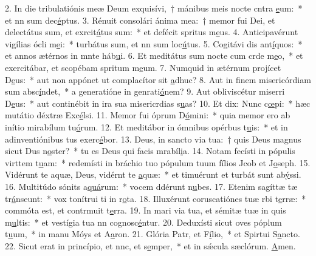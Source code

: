 2. In die tribulatiónis meæ Deum exquisívi,~† mánibus meis nocte cntra \uline{e}um:~* et nn sum dec\uline{é}ptus.
3. Rénuit consolári ánima mea:~† memor fui Dei, et delectátus sum, et exrcit\uline{á}tus sum:~* et defécit spritus m\uline{e}us.
4. Anticipavérunt vigílias ócli m\uline{e}i:~* turbátus sum, et nn sum loc\uline{ú}tus.
5. Cogitávi dis ant\uline{í}quos:~* et annos ætérnos in mnte háb\uline{u}i.
6. Et meditátus sum nocte cum crde m\uline{e}o,~* et exercitábar, et scopébam spritum m\uline{e}um.
7. Numquid in ætérnum projícet D\uline{e}us:~* aut non appónet ut complacítor sit \uline{a}dhuc?
8. Aut in finem misericórdiam sum absc\uline{í}ndet,~* a generatióne in genrati\uline{ó}nem?
9. Aut obliviscétur miserri D\uline{e}us:~* aut continébit in ira sua misericrdias s\uline{u}as?
10. Et dix: Nunc c\uline{œ}pi:~* hæc mutátio déxtræ Exc\uline{é}lsi.
11. Memor fui óprum D\uline{ó}mini:~* quia memor ero ab inítio mirabílum tu\uline{ó}rum.
12. Et meditábor in ómnibus opérbus t\uline{u}is:~* et in adinventiónibus tus exerc\uline{é}bor.
13. Deus, in sancto via tua:~† quis Deus magnus sicut Dus n\uline{o}ster?~* tu es Deus qui facis mrabíl\uline{i}a.
14. Notam fecísti in pópulis virttem t\uline{u}am:~* redemísti in bráchio tuo pópulum tuum fílios Jcob et J\uline{o}seph.
15. Vidérunt te aquæ, Deus, vidérnt te \uline{a}quæ:~* et timuérunt et turbát sunt ab\uline{ý}ssi.
16. Multitúdo sónits a\uline{quá}rum:~* vocem ddérunt n\uline{u}bes.
17. Etenim sagíttæ tæ tr\uline{á}nseunt:~* vox tonítrui ti in r\uline{o}ta.
18. Illuxérunt coruscatiónes tuæ rbi t\uline{e}rræ:~* commóta est, et contrmuit t\uline{e}rra.
19. In mari via tua, et sémitæ tuæ in quis m\uline{u}ltis:~* et vestígia tua nn cognosc\uline{é}ntur.
20. Deduxísti sicut oves póplum t\uline{u}um,~* in manu Móys et A\uline{a}ron.
21. Glória Patr, et F\uline{í}lio,~* et Spirtui S\uline{a}ncto.
22. Sicut erat in princípio, et nnc, et s\uline{e}mper,~* et in sǽcula sæclórum. \uline{A}men.
